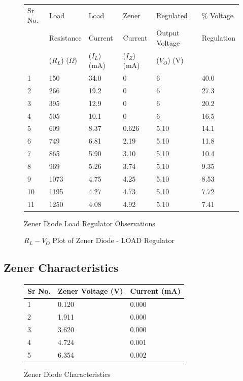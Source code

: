 			\begin{figure}[h!]
				\begin{longtable}[]{@{}llllll@{}}
					\toprule
					Sr No. & Load & Load & Zener & Regulated & \% Voltage\tabularnewline
					& Resistance & Current & Current & Output Voltage & Regulation\tabularnewline
					& ($R_L$) ($\Omega$) & ($I_L$) (mA) & ($I_Z$)(mA) & ($V_O$) (V) & \tabularnewline
					\midrule
					\endhead
					1 & 150 & 34.0 & 0 & 6 & 40.0\tabularnewline
					2 & 266 & 19.2 & 0 & 6 & 27.3\tabularnewline
					3 & 395 & 12.9 & 0 & 6 & 20.2\tabularnewline
					4 & 505 & 10.1 & 0 & 6 & 16.5\tabularnewline
					5 & 609 & 8.37 & 0.626 & 5.10 & 14.1\tabularnewline
					6 & 749 & 6.81 & 2.19 & 5.10 & 11.8\tabularnewline
					7 & 865 & 5.90 & 3.10 & 5.10 & 10.4\tabularnewline
					8 & 969 & 5.26 & 3.74 & 5.10 & 9.35\tabularnewline
					9 & 1073 & 4.75 & 4.25 & 5.10 & 8.53\tabularnewline
					10 & 1195 & 4.27 & 4.73 & 5.10 & 7.72\tabularnewline
					11 & 1250 & 4.08 & 4.92 & 5.10 & 7.41\tabularnewline
					\bottomrule
				\end{longtable}
				\caption{Zener Diode Load Regulator Observations}
			\end{figure}
			\newpage
			\begin{figure}[h]
				\centering
				\caption{$R_L - V_O$ Plot of Zener Diode - LOAD Regulator}
			\end{figure}
		\subsection{Zener Characteristics}			
			\begin{figure}[h]
				\begin{longtable}[]{@{}lll@{}}
					\toprule
					Sr No. & Zener Voltage (V) & Current (mA)\tabularnewline
					\midrule
					\endhead
					1 & 0.120 & 0.000\tabularnewline
					2 & 1.911 & 0.000\tabularnewline
					3 & 3.620 & 0.000\tabularnewline
					4 & 4.724 & 0.001\tabularnewline
					5 & 6.354 & 0.002\tabularnewline
					\bottomrule
				\end{longtable}
				\caption{Zener Diode Characteristics}
			\end{figure}
		
